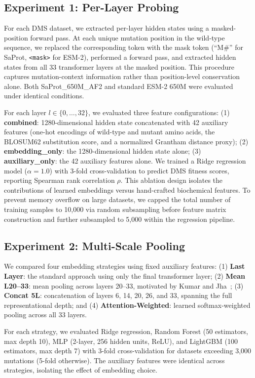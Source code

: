 \documentclass[11pt,a4paper]{article}
\begin{document}
\subsection{Experiment 1: Per-Layer Probing}

For each DMS dataset, we extracted per-layer hidden states using a masked-position
forward pass. At each unique mutation position in the wild-type sequence, we replaced
the corresponding token with the mask token (``M\#'' for SaProt, \texttt{<mask>} for ESM-2),
performed a forward pass, and extracted
hidden states from all 33 transformer layers at the masked position. This procedure
captures mutation-context information rather than position-level conservation alone.
Both SaProt\_650M\_AF2 and standard ESM-2 650M were evaluated under identical conditions.

For each layer $l \in \{0,\dots,32\}$, we evaluated three feature configurations:
(1) \textbf{combined}: 1280-dimensional hidden state concatenated with 42 auxiliary features
(one-hot encodings of wild-type and mutant amino
acids, the BLOSUM62 substitution score, and a normalized Grantham distance proxy);
(2) \textbf{embedding\_only}: the 1280-dimensional hidden state alone;
(3) \textbf{auxiliary\_only}: the 42 auxiliary features alone.
We trained a Ridge regression model ($\alpha=1.0$) with 3-fold cross-validation to
predict DMS fitness scores, reporting Spearman rank correlation $\rho$. This
ablation design isolates the contributions of learned embeddings versus hand-crafted
biochemical features. To prevent
memory overflow on large datasets, we capped the total number of training samples
to 10,000 via random subsampling before feature matrix construction and further
subsampled to 5,000 within the regression pipeline.

\subsection{Experiment 2: Multi-Scale Pooling}

We compared four embedding strategies using fixed auxiliary features:
(1) \textbf{Last Layer}: the standard approach using only the final transformer layer;
(2) \textbf{Mean L20--33}: mean pooling across layers 20--33, motivated by
Kumar and Jha~\cite{kumar2025};
(3) \textbf{Concat 5L}: concatenation of layers 6, 14, 20, 26, and 33, spanning
the full representational depth; and
(4) \textbf{Attention-Weighted}: learned softmax-weighted pooling across all 33 layers.

For each strategy, we evaluated Ridge regression, Random Forest (50 estimators,
max depth 10), MLP (2-layer, 256 hidden units, ReLU), and LightGBM (100 estimators,
max depth 7) with 3-fold cross-validation for datasets exceeding 3,000 mutations
(5-fold otherwise). The auxiliary features were identical across strategies, isolating
the effect of embedding choice.
\end{document}
